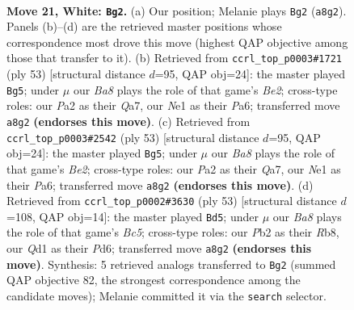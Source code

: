 \documentclass[11pt]{article}
\begin{document}
\clearpage

\begin{figure}[p]\centering
\begin{subfigure}{0.46\textwidth}\centering
\resizebox{\linewidth}{!}{%
\newchessgame
\chessboard[
  setfen={Bnb1k3/8/5q2/ppb2p2/8/6r1/PP2PP2/R2QNRK1 w - - 0 21},
  showmover=false,
  pgfstyle=straightmove, color=movearrow, markmove={a8-g2}
]}
\caption{}
\end{subfigure}\hfill
\begin{subfigure}{0.46\textwidth}\centering
\resizebox{\linewidth}{!}{%
\newchessgame
\chessboard[
  setfen={2r2r1k/q3b1pp/p7/8/4BpP1/1R6/P1PQ2P1/5R1K b - - 1 27},
  showmover=false,
  pgfstyle=straightmove, color=movearrow, markmove={e7-g5}
]}
\caption{}
\end{subfigure}
\\[4pt]
\begin{subfigure}{0.46\textwidth}\centering
\resizebox{\linewidth}{!}{%
\newchessgame
\chessboard[
  setfen={2r2r1k/q3b1pp/p7/8/4BpP1/1R6/P1PQ2P1/5R1K b - - 1 27},
  showmover=false,
  pgfstyle=straightmove, color=movearrow, markmove={e7-g5}
]}
\caption{}
\end{subfigure}\hfill
\begin{subfigure}{0.46\textwidth}\centering
\resizebox{\linewidth}{!}{%
\newchessgame
\chessboard[
  setfen={1r2r3/pp2k3/2pp3p/2n2P2/2b5/2P2B2/P2R1B1P/1R5K b - - 0 27},
  showmover=false,
  pgfstyle=straightmove, color=movearrow, markmove={c4-d5}
]}
\caption{}
\end{subfigure}
\caption{\textbf{Move 21, White: \texttt{Bg2}.} (a) Our position; Melanie plays \texttt{Bg2} (\texttt{a8g2}). Panels (b)--(d) are the retrieved master positions whose correspondence most drove this move (highest QAP objective among those that transfer to it). (b) Retrieved from \texttt{ccrl\_top\_p0003\#1721} (ply 53) [structural distance $d$=95, QAP obj=24]: the master played \texttt{Bg5}; under $\mu$ our \emph{Ba8} plays the role of that game's \emph{Be2}; cross-type roles: our \emph{P}a2 as their \emph{Q}a7, our \emph{N}e1 as their \emph{P}a6; transferred move \texttt{a8g2} \textbf{(endorses this move)}. (c) Retrieved from \texttt{ccrl\_top\_p0003\#2542} (ply 53) [structural distance $d$=95, QAP obj=24]: the master played \texttt{Bg5}; under $\mu$ our \emph{Ba8} plays the role of that game's \emph{Be2}; cross-type roles: our \emph{P}a2 as their \emph{Q}a7, our \emph{N}e1 as their \emph{P}a6; transferred move \texttt{a8g2} \textbf{(endorses this move)}. (d) Retrieved from \texttt{ccrl\_top\_p0002\#3630} (ply 53) [structural distance $d$=108, QAP obj=14]: the master played \texttt{Bd5}; under $\mu$ our \emph{Ba8} plays the role of that game's \emph{Bc5}; cross-type roles: our \emph{P}b2 as their \emph{R}b8, our \emph{Q}d1 as their \emph{P}d6; transferred move \texttt{a8g2} \textbf{(endorses this move)}. Synthesis: 5 retrieved analogs transferred to \texttt{Bg2} (summed QAP objective 82, the strongest correspondence among the candidate moves); Melanie committed it via the \texttt{search} selector.}
\label{fig:thought-m40}
\end{figure}
\end{document}
